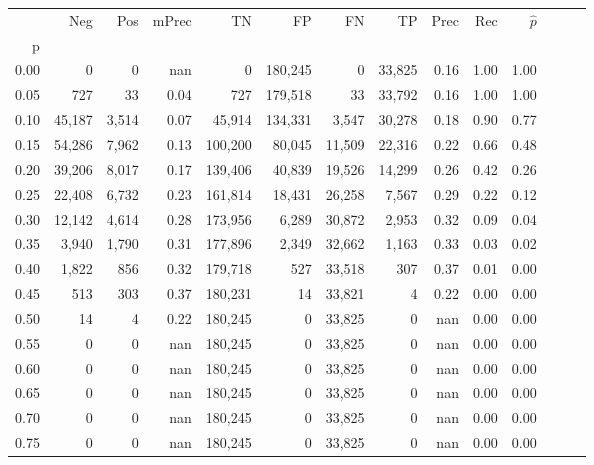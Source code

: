 \begin{tabular}{rrrrrrrrrrrrrr}
\toprule
{} &     Neg &    Pos & mPrec &       TN &       FP &      FN &      TP &  Prec &   Rec & $\hat{p}$ \\
p    &         &        &       &          &          &         &         &       &       &           \\
\midrule
0.00 &       0 &      0 &   nan &        0 &  180,245 &       0 &  33,825 &  0.16 &  1.00 &      1.00 \\
0.05 &     727 &     33 &  0.04 &      727 &  179,518 &      33 &  33,792 &  0.16 &  1.00 &      1.00 \\
0.10 &  45,187 &  3,514 &  0.07 &   45,914 &  134,331 &   3,547 &  30,278 &  0.18 &  0.90 &      0.77 \\
0.15 &  54,286 &  7,962 &  0.13 &  100,200 &   80,045 &  11,509 &  22,316 &  0.22 &  0.66 &      0.48 \\
0.20 &  39,206 &  8,017 &  0.17 &  139,406 &   40,839 &  19,526 &  14,299 &  0.26 &  0.42 &      0.26 \\
0.25 &  22,408 &  6,732 &  0.23 &  161,814 &   18,431 &  26,258 &   7,567 &  0.29 &  0.22 &      0.12 \\
0.30 &  12,142 &  4,614 &  0.28 &  173,956 &    6,289 &  30,872 &   2,953 &  0.32 &  0.09 &      0.04 \\
0.35 &   3,940 &  1,790 &  0.31 &  177,896 &    2,349 &  32,662 &   1,163 &  0.33 &  0.03 &      0.02 \\
0.40 &   1,822 &    856 &  0.32 &  179,718 &      527 &  33,518 &     307 &  0.37 &  0.01 &      0.00 \\
0.45 &     513 &    303 &  0.37 &  180,231 &       14 &  33,821 &       4 &  0.22 &  0.00 &      0.00 \\
0.50 &      14 &      4 &  0.22 &  180,245 &        0 &  33,825 &       0 &   nan &  0.00 &      0.00 \\
0.55 &       0 &      0 &   nan &  180,245 &        0 &  33,825 &       0 &   nan &  0.00 &      0.00 \\
0.60 &       0 &      0 &   nan &  180,245 &        0 &  33,825 &       0 &   nan &  0.00 &      0.00 \\
0.65 &       0 &      0 &   nan &  180,245 &        0 &  33,825 &       0 &   nan &  0.00 &      0.00 \\
0.70 &       0 &      0 &   nan &  180,245 &        0 &  33,825 &       0 &   nan &  0.00 &      0.00 \\
0.75 &       0 &      0 &   nan &  180,245 &        0 &  33,825 &       0 &   nan &  0.00 &      0.00 \\

\end{tabular}
